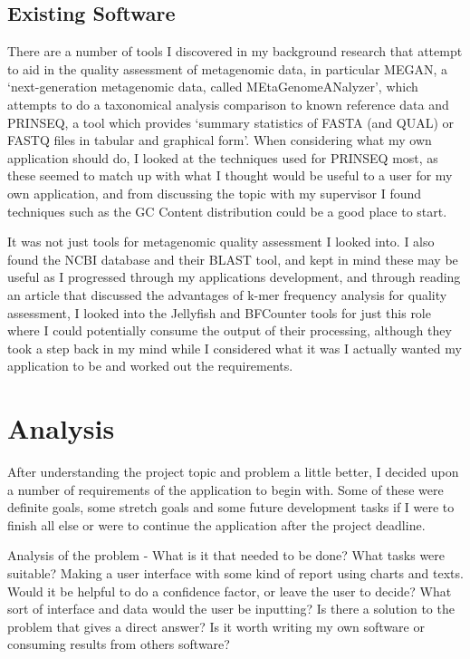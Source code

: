 \subsection{Existing Software}
There are a number of tools I discovered in my background research that attempt to aid in the quality assessment of metagenomic data, in particular MEGAN, a `next-generation metagenomic data, called MEtaGenomeANalyzer', which attempts to do a taxonomical analysis comparison to known reference data\cite{citeulike:10457549} and PRINSEQ, a tool which provides `summary statistics of FASTA (and QUAL) or FASTQ files in tabular and graphical form'\cite{citeulike:8714996}. When considering what my own application should do, I looked at the techniques used for PRINSEQ most, as these seemed to match up with what I thought would be useful to a user for my own application, and from discussing the topic with my supervisor I found techniques such as the GC Content distribution could be a good place to start.

It was not just tools for metagenomic quality assessment I looked into. I also found the NCBI database and their BLAST tool\cite{citeulike:11826724}, and kept in mind these may be useful as I progressed through my applications development, and through reading an article that discussed the advantages of k-mer frequency analysis for quality assessment, I looked into the Jellyfish\cite{citeulike:8643499} and BFCounter\cite{citeulike:9639487} tools for just this role where I could potentially consume the output of their processing, although they took a step back in my mind while I considered what it was I actually wanted my application to be and worked out the requirements.


\section{Analysis}
After understanding the project topic and problem a little better, I decided upon a number of requirements of the application to begin with. Some of these were definite goals, some stretch goals and some future development tasks if I were to finish all else or were to continue the application after the project deadline.

Analysis of the problem - What is it that needed to be done? What tasks were suitable? Making a user interface with some kind of report using charts and texts. Would it be helpful to do a confidence factor, or leave the user to decide? What sort of interface and data would the user be inputting? Is there a solution to the problem that gives a direct answer? Is it worth writing my own software or consuming results from others software?

